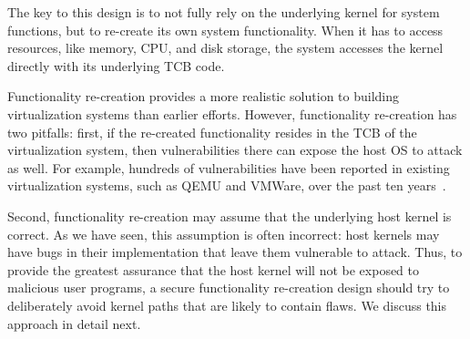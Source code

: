 
The key to this design is to not fully rely on the underlying
kernel for system functions, but to re-create its own system functionality.
When it has to access resources, like memory, CPU, and disk storage, the system
accesses the kernel directly with its underlying TCB code.

Functionality re-creation provides a more realistic solution to building
virtualization systems than earlier efforts.
However, functionality re-creation has two pitfalls:
first, if the re-created functionality resides in the TCB of the virtualization system, then vulnerabilities there can expose the host OS to attack as well.
For example, hundreds of vulnerabilities have been
reported in existing virtualization systems, such as QEMU and VMWare, over the
past ten years~\cite{NVD}.

Second, functionality re-creation may assume that the underlying host kernel is correct.
As we have seen, this assumption is often incorrect: host kernels may have bugs in their implementation that leave them vulnerable to attack.
Thus, to provide the greatest assurance that the host kernel will not be exposed to malicious user programs,
a secure functionality re-creation design should try to deliberately avoid kernel paths that are likely to contain flaws.
We discuss this approach in detail next.

